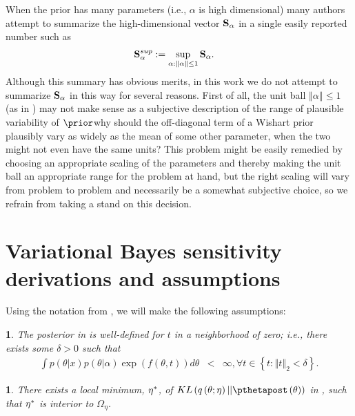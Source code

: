 \documentclass{article}\usepackage[]{graphicx}\usepackage[]{color}
\theoremstyle{plain}
\theoremstyle{definition}
\theoremstyle{plain}
\theoremstyle{plain}
\newtheorem{assumption}[thm]{\protect\assumptionname}
\theoremstyle{plain}
\theoremstyle{plain}
\providecommand{\assumptionname}{Assumption}
\begin{document}
When the prior has many parameters (i.e., $\alpha$ is high dimensional)
many authors \citep[e.g.][]{basu:1996:local,gustafson:1996:localposterior,roos:2015:sensitivity}
attempt to summarize the high-dimensional vector $\mathbf{S}_{\alpha}$ in a single
easily reported number such as
\begin{align*}
\mathbf{S}_{\alpha}^{sup} & :=\sup_{\alpha:\left\Vert \alpha\right\Vert \le1}\mathbf{S}_{\alpha}.
\end{align*}
Although this summary has obvious merits, in this work we do not attempt
to summarize $\mathbf{S}_{\alpha}$ in this way for several reasons. First of all,
the unit ball $\left\Vert \alpha\right\Vert \le1$ (as in \citet{basu:1996:local})
may not make sense as a subjective description of the range of plausible
variability of $\prior$\textemdash why should the off-diagonal term
of a Wishart prior plausibly vary as widely as the mean of some other
parameter, when the two might not even have the same units? This problem
might be easily remedied by choosing an appropriate scaling of the
parameters and thereby making the unit ball an appropriate range for
the problem at hand, but the right scaling will vary from problem
to problem and necessarily be a somewhat subjective choice, so we
refrain from taking a stand on this decision. 

\section{Variational Bayes sensitivity derivations and assumptions\label{app:lrvb}}

Using the notation from , we will
make the following assumptions:
\begin{assumption}
The posterior in  is well-defined for $t$
in a neighborhood of zero; i.e., there exists some $\delta>0$ such
that \label{assu:tilt_exists}
\begin{eqnarray*}
\int p\left(\theta\vert x\right)p\left(\theta\vert\alpha\right)\exp\left(f\left(\theta,t\right)\right)d\theta & < & \infty,\forall t\in\left\{ t:\left\Vert t\right\Vert _{2}<\delta\right\} .
\end{eqnarray*}
\end{assumption}

\begin{assumption}
There exists a local minimum, $\eta^{*}$, of $KL\left(q\left(\theta;\eta\right)||\pthetapost\left(\theta\right)\right)$
in , such that $\eta^{*}$ is interior
to $\Omega_{\eta}$.\label{assu:opt_interior}
\end{assumption}
\end{document}
